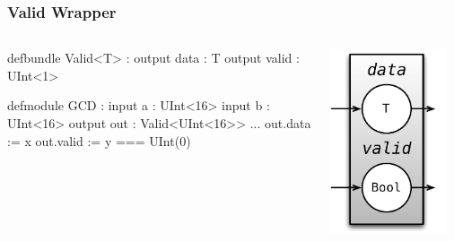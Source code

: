 \documentclass[xcolor=pdflatex,dvipsnames,table]{beamer}
\begin{document}
\begin{frame}[fragile]
\frametitle{Valid Wrapper}

\begin{columns}


\begin{footnotesize}
\begin{stanza}
defbundle Valid<T> :
  output data : T
  output valid : UInt<1>

defmodule GCD :
  input a : UInt<16>
  input b : UInt<16>
  output out : Valid<UInt<16>>
  ...
  out.data  := x
  out.valid := y === UInt(0)
\end{stanza}
\end{footnotesize}


\begin{center}
\includegraphics[width=0.9\textwidth]{figs/valid.pdf} 
\end{center}

\end{columns}

\end{frame}
\end{document}
